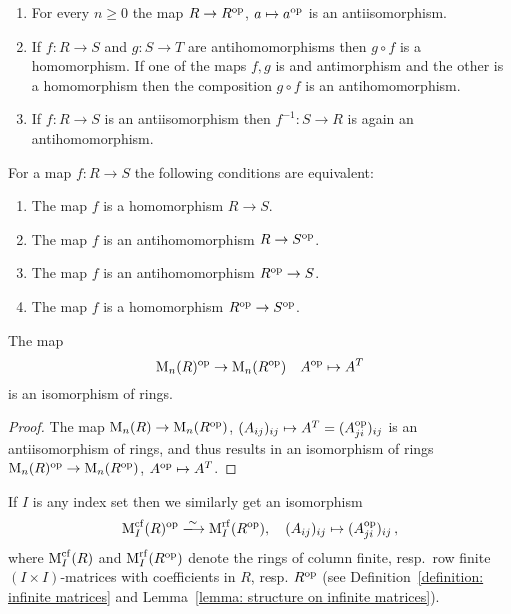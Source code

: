 \begin{example}
  \leavevmode
  \begin{enumerate}
     \item
      For every $n \geq 0$ the map $R \to R^{\operatorname{op}}$, $a \mapsto a^{\operatorname{op}}$ is an antiisomorphism.
     \item
      If $f \colon R \to S$ and $g \colon S \to T$ are antihomomorphisms then $g \circ f$ is a homomorphism.
      If one of the maps $f, g$ is and antimorphism and the other is a homomorphism then the composition $g \circ f$ is an antihomomorphism.
    \item
      If $f \colon R \to S$ is an antiisomorphism then $f^{-1} \colon S \to R$ is again an antihomomorphism.
  \end{enumerate}
\end{example}


\begin{lemma}
  For a map $f \colon R \to S$ the following conditions are equivalent:
  \begin{enumerate}
    \item
      The map $f$ is a homomorphism $R \to S$.
    \item
      The map $f$ is an antihomomorphism $R \to S^{\operatorname{op}}$.
    \item
      The map $f$ is an antihomomorphism $R^{\operatorname{op}} \to S$.
    \item
      The map $f$ is a homomorphism $R^{\operatorname{op}} \to S^{\operatorname{op}}$.
  \end{enumerate}
\end{lemma}


\begin{lemma}
  \label{lemma: op of matrix rings}
  The map
  \[
            \operatorname{M}_n(R)^{\operatorname{op}}
    \to     \operatorname{M}_n(R^{\operatorname{op}})
    \quad   A^{\operatorname{op}}
    \mapsto A^T
  \]
  is an isomorphism of rings.
\end{lemma}


\begin{proof}
  The map $\operatorname{M}_n(R) \to \operatorname{M}_n(R^{\operatorname{op}})$, $(A_{ij})_{ij} \mapsto A^T = (A^{\operatorname{op}}_{ji})_{ij}$ is an antiisomorphism of rings, and thus results in an isomorphism of rings $\operatorname{M}_n(R)^{\operatorname{op}} \to \operatorname{M}_n(R^{\operatorname{op}})$, $A^{\operatorname{op}} \mapsto A^T$.
\end{proof}


\begin{remark}
  \label{remark: transposing infinite matrix ring opposite ring}
  If $I$ is any index set then we similarly get an isomorphism
  \[
            \Mat_I^\cf(R)^\op
    \xlongrightarrow{\sim}
            \Mat_I^{\rf}(R^\op),
    \quad   (A_{ij})_{ij}
    \mapsto (A_{ji}^\op)_{ij} \,,
  \]
  where $\operatorname{M}_I^{\operatorname{cf}}(R)$ and $\operatorname{M}_I^{\operatorname{rf}}(R^{\operatorname{op}})$ denote the rings of column finite, resp.\ row finite $(I \times I)$-matrices with coefficients in $R$, resp. $R^{\operatorname{op}}$ (see Definition~\ref{definition: infinite matrices} and Lemma~\ref{lemma: structure on infinite matrices}).
\end{remark}



